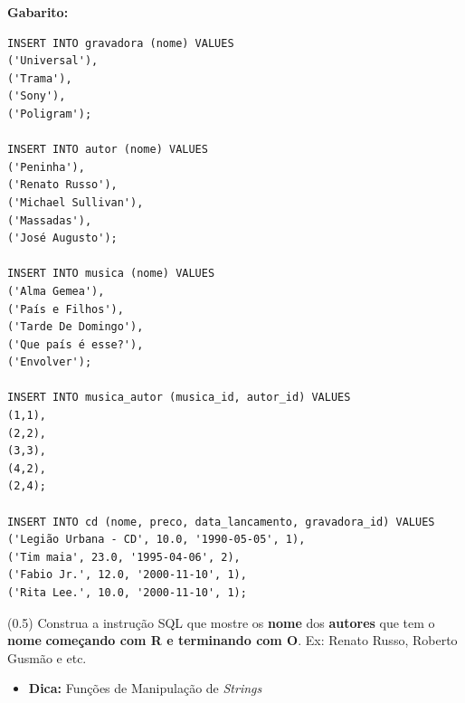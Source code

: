\documentclass[12pt]{exam}
\begin{document}
\begin{questions}
\textbf{Gabarito:}
\begin{verbatim}
INSERT INTO gravadora (nome) VALUES 
('Universal'),
('Trama'),
('Sony'),
('Poligram');

INSERT INTO autor (nome) VALUES 
('Peninha'),
('Renato Russo'),
('Michael Sullivan'),
('Massadas'),
('José Augusto');

INSERT INTO musica (nome) VALUES 
('Alma Gemea'),
('País e Filhos'),
('Tarde De Domingo'),
('Que país é esse?'),
('Envolver');

INSERT INTO musica_autor (musica_id, autor_id) VALUES 
(1,1),
(2,2),
(3,3),
(4,2),
(2,4);

INSERT INTO cd (nome, preco, data_lancamento, gravadora_id) VALUES 
('Legião Urbana - CD', 10.0, '1990-05-05', 1),
('Tim maia', 23.0, '1995-04-06', 2),
('Fabio Jr.', 12.0, '2000-11-10', 1),
('Rita Lee.', 10.0, '2000-11-10', 1);
\end{verbatim}







\question (0.5)  Construa a instrução SQL que mostre os \textbf{nome} dos \textbf{autores} que tem o \textbf{nome} \textbf{começando com R e terminando com O}. Ex: Renato Russo, Roberto Gusmão e etc.

\begin{itemize}
    \item \textbf{Dica:} Funções de Manipulação de \textit{Strings}
\end{itemize}


\end{questions}
\end{document}
